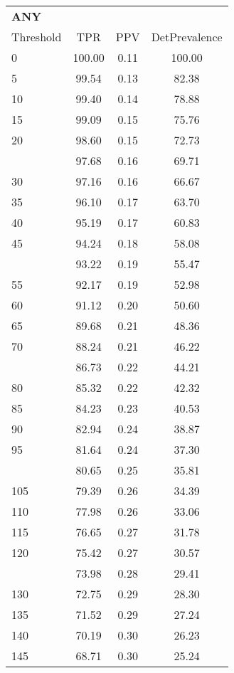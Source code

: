 \begin{table}[t]
\centering
\tiny
\begin{tabular}{lccc}
  \toprule
  \multicolumn{4}{l}{\textbf{ANY}} \\\addlinespace
Threshold & TPR & PPV & DetPrevalence \\ 
  \midrule
0 & 100.00 & 0.11 & 100.00 \\ 
  5 & 99.54 & 0.13 & 82.38 \\ 
  10 & 99.40 & 0.14 & 78.88 \\ 
  15 & 99.09 & 0.15 & 75.76 \\ 
  20 & 98.60 & 0.15 & 72.73 \\ 
   \addlinespace
25 & 97.68 & 0.16 & 69.71 \\ 
  30 & 97.16 & 0.16 & 66.67 \\ 
  35 & 96.10 & 0.17 & 63.70 \\ 
  40 & 95.19 & 0.17 & 60.83 \\ 
  45 & 94.24 & 0.18 & 58.08 \\ 
   \addlinespace
50 & 93.22 & 0.19 & 55.47 \\ 
  55 & 92.17 & 0.19 & 52.98 \\ 
  60 & 91.12 & 0.20 & 50.60 \\ 
  65 & 89.68 & 0.21 & 48.36 \\ 
  70 & 88.24 & 0.21 & 46.22 \\ 
   \addlinespace
75 & 86.73 & 0.22 & 44.21 \\ 
  80 & 85.32 & 0.22 & 42.32 \\ 
  85 & 84.23 & 0.23 & 40.53 \\ 
  90 & 82.94 & 0.24 & 38.87 \\ 
  95 & 81.64 & 0.24 & 37.30 \\ 
   \addlinespace
100 & 80.65 & 0.25 & 35.81 \\ 
  105 & 79.39 & 0.26 & 34.39 \\ 
  110 & 77.98 & 0.26 & 33.06 \\ 
  115 & 76.65 & 0.27 & 31.78 \\ 
  120 & 75.42 & 0.27 & 30.57 \\ 
   \addlinespace
125 & 73.98 & 0.28 & 29.41 \\ 
  130 & 72.75 & 0.29 & 28.30 \\ 
  135 & 71.52 & 0.29 & 27.24 \\ 
  140 & 70.19 & 0.30 & 26.23 \\ 
  145 & 68.71 & 0.30 & 25.24 \\ 

\end{tabular}
\end{table}
